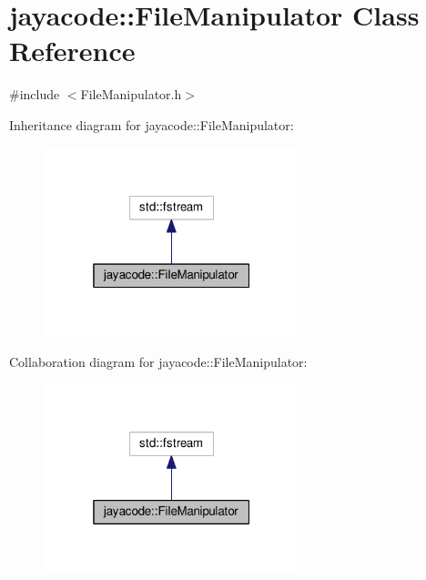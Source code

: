 \hypertarget{classjayacode_1_1_file_manipulator}{}\section{jayacode\+:\+:File\+Manipulator Class Reference}
\label{classjayacode_1_1_file_manipulator}


{\ttfamily \#include $<$File\+Manipulator.\+h$>$}



Inheritance diagram for jayacode\+:\+:File\+Manipulator\+:
\nopagebreak
\begin{figure}[H]
\begin{center}
\leavevmode
\includegraphics[width=208pt]{classjayacode_1_1_file_manipulator__inherit__graph}
\end{center}
\end{figure}


Collaboration diagram for jayacode\+:\+:File\+Manipulator\+:
\nopagebreak
\begin{figure}[H]
\begin{center}
\leavevmode
\includegraphics[width=208pt]{classjayacode_1_1_file_manipulator__coll__graph}
\end{center}
\end{figure}
